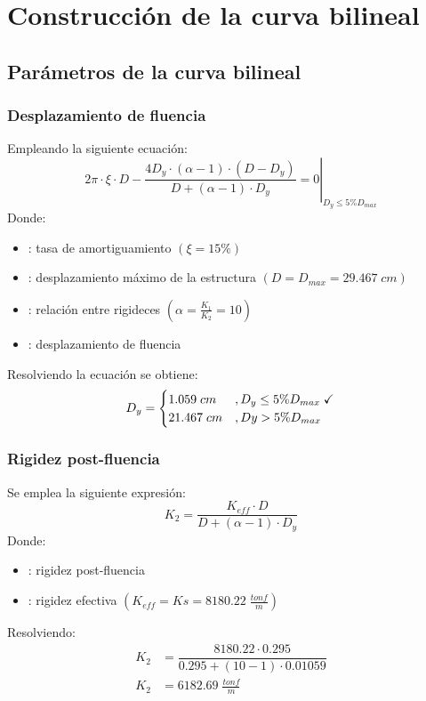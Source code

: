 \onehalfspacing

\section{Construcción de la curva bilineal}

\subsection{Parámetros de la curva bilineal}

\subsubsection{Desplazamiento de fluencia}
Empleando la siguiente ecuación:
\begin{equation}
      \left. 2\pi \cdot \xi \cdot D - \dfrac{4D_y \cdot (\alpha - 1) \cdot (D - D_y)}{D + (\alpha - 1) \cdot D_y} = 0 \right |_{D_y \leq 5\%D_{max}}
      \label{eq2_1}
\end{equation}
Donde:
\begin{itemize}
    \item{\makebox[0.6cm][l]{$\xi$}}: tasa de amortiguamiento $(\xi = 15\%)$
    \item{}: desplazamiento máximo de la estructura $(D = D_{max} = 29.467 \; cm)$
    \item{\makebox[0.6cm][l]{$\alpha$}}: relación entre rigideces $\left(\alpha = \frac{K_1}{K_2} = 10 \right)$
    \item{}: desplazamiento de fluencia
\end{itemize}
{\noindent Resolviendo la ecuación se obtiene:}
\begin{align*}
    D_y = 
    \begin{cases}
        1.059 \; cm &, D_y \leq 5\%D_{max} \; \text{\checkmark} \\
        21.467 \; cm &, Dy > 5\%D_{max}
    \end{cases}
\end{align*}

\subsubsection{Rigidez post-fluencia}
Se emplea la siguiente expresión:
\begin{equation}
    K_2 = \dfrac{K_{eff} \cdot D}{D + (\alpha - 1) \cdot D_y} \label{eq2_2}
\end{equation}
Donde:
\begin{itemize}
    \item{}: rigidez post-fluencia
    \item{}: rigidez efectiva $\left( K_{eff} = Ks = 8180.22 \; \frac{tonf}{m} \right)$
\end{itemize}
Resolviendo:
\begin{align*}
    K_2 &= \dfrac{8180.22 \cdot 0.295}{0.295 + (10 - 1) \cdot 0.01059} \\
    K_2 &= 6182.69 \; \frac{tonf}{m}
\end{align*}

